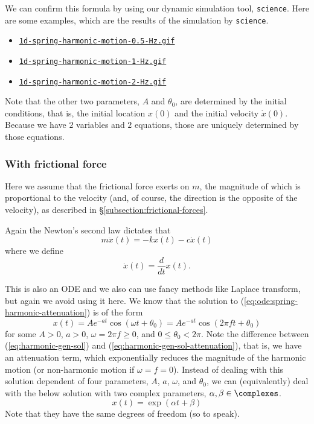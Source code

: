 \documentclass{article}
\begin{document}
We can confirm this formula by using our dynamic simulation tool, {\tt science}.
Here are some examples, which are the results of the simulation by {\tt science}.

\begin{itemize}
\item
{\tt \href{https://github.com/sungheeyun/science/blob/main/animations/1d-spring-harmonic-motion-0.5-Hz.gif}{1d-spring-harmonic-motion-0.5-Hz.gif}}
\item
{\tt \href{https://github.com/sungheeyun/science/blob/main/animations/1d-spring-harmonic-motion-1-Hz.gif}{1d-spring-harmonic-motion-1-Hz.gif}}
\item
{\tt \href{https://github.com/sungheeyun/science/blob/main/animations/1d-spring-harmonic-motion-2-Hz.gif}{1d-spring-harmonic-motion-2-Hz.gif}}
\end{itemize}

Note that the other two parameters, $A$ and $\theta_0$, are determined by the initial conditions,
that is, the initial location $x(0)$ and the initial velocity $\dot{x}(0)$.
Because we have $2$ variables and $2$ equations,
those are uniquely determined by those equations.


\subsubsection{With frictional force}
\label{subsubsection:spring-with-frictional-force}

Here we assume that the frictional force exerts on $m$,
the magnitude of which is proportional to the velocity
(and, of course, the direction is the opposite of the velocity),
as described in \S\ref{subsection:frictional-forces}.

Again the Newton's second law dictates that
\begin{equation}
\label{eq:ode:spring-harmonic-attenuation}
	m \ddot{x}(t)
	=
	-kx(t) - c \dot{x}(t)
\end{equation}
where we define
\[
	\dot{x}(t) = \frac{d}{dt} x(t).
\]

This is also an ODE and we also can use fancy methods like Laplace transform, but again we avoid using it here.
We know that the solution to (\ref{eq:ode:spring-harmonic-attenuation})
is of the form
\begin{equation}
\label{eq:harmonic-gen-sol-attenuation}
	x(t) = A e^{-at} \cos(\omega t + \theta_0)
	= A e^{-at}\cos(2\pi f t + \theta_0)
\end{equation}
for some $A>0$, $a>0$, $\omega=2\pi f \geq0$, and $0\leq \theta_0 <2\pi$.
Note the difference between (\ref{eq:harmonic-gen-sol}) and (\ref{eq:harmonic-gen-sol-attenuation}),
that is,
we have an attenuation term,
which exponentially reduces the magnitude of the harmonic motion
(or non-harmonic motion if $\omega=f=0$).
Instead of dealing with this solution dependent of four parameters, $A$, $a$, $\omega$, and $\theta_0$,
we can (equivalently) deal with the below solution with two complex parameters, $\alpha,\beta\in\complexes$.
\begin{equation}
\label{eq:harmonic-gen-sol-complex}
x(t) = \exp(\alpha t + \beta)
\end{equation}
Note that they have the same degrees of freedom (so to speak).
\end{document}
